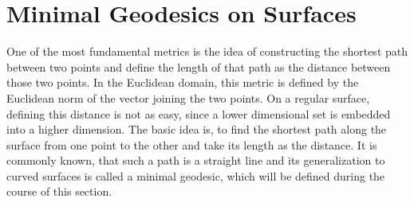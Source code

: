 \section{Minimal Geodesics on Surfaces}
One of the most fundamental metrics is the idea of constructing the shortest path between two points and define the length of that path as the distance between those two points.
In the Euclidean domain, this metric is defined by the Euclidean norm of the vector joining the two points.
On a regular surface, defining this distance is not as easy, since a lower dimensional set is embedded into a higher dimension.
The basic idea is, to find the shortest path along the surface from one point to the other and take its length as the distance.
It is commonly known, that such a path is a straight line and its generalization to curved surfaces is called a minimal geodesic, which will be defined during the course of this section.

